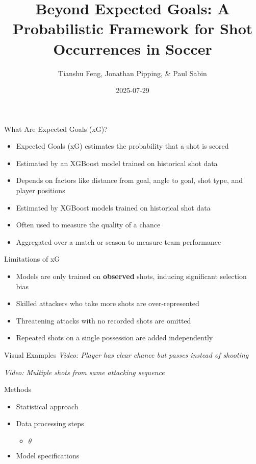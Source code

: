 \documentclass[
  11pt,
  ignorenonframetext,
]{beamer}
\title[Beyond Expected Goals]{Beyond Expected Goals: A Probabilistic
Framework for Shot Occurrences in Soccer}
\author[Feng, T., Pipping, J., \& Sabin, P.]{Tianshu Feng, Jonathan
Pipping, \& Paul Sabin}
\date{2025-07-29}
\institute[UPenn]{University of Pennsylvania}
\providecommand{\tightlist}{%
  \setlength{\itemsep}{0pt}\setlength{\parskip}{0pt}}
\begin{document}
\frame{\titlepage}

\begin{frame}{What Are Expected Goals (xG)?}
\protect{}\label{what-are-expected-goals-xg}
\begin{itemize}
\tightlist
\item
  Expected Goals (xG) estimates the probability that a shot is scored
\item
  Estimated by an XGBoost model trained on historical shot data
\item
  Depends on factors like distance from goal, angle to goal, shot type,
  and player positions
\item
  Estimated by XGBoost models trained on historical shot data
\item
  Often used to measure the quality of a chance
\item
  Aggregated over a match or season to measure team performance
\end{itemize}
\end{frame}

\begin{frame}{Limitations of xG}
\protect{}\label{limitations-of-xg}
\begin{itemize}
\tightlist
\item
  Models are only trained on \textbf{observed} shots, inducing
  significant selection bias
\item
  Skilled attackers who take more shots are over-represented
\item
  Threatening attacks with no recorded shots are omitted
\item
  Repeated shots on a single possession are added independently
\end{itemize}
\end{frame}

\begin{frame}{Visual Examples}
\protect{}\label{visual-examples}
\emph{Video: Player has clear chance but passes instead of shooting}

\emph{Video: Multiple shots from same attacking sequence}
\end{frame}

\begin{frame}{Methods}
\protect{}\label{methods}
\begin{itemize}
\tightlist
\item
  Statistical approach
\item
  Data processing steps

  \begin{itemize}
  \tightlist
  \item
    \(\theta\)
  \end{itemize}
\item
  Model specifications
\end{itemize}
\end{frame}
\end{document}
